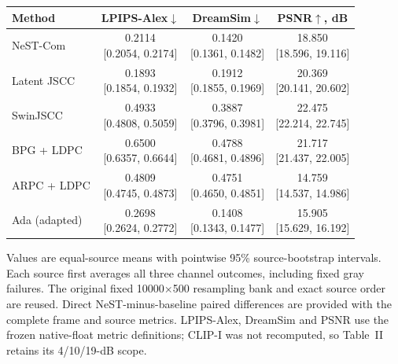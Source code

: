 \begin{center}\footnotesize\setlength{\tabcolsep}{5pt}
\begin{tabular}{lccc}\toprule
Method & LPIPS-Alex$\downarrow$ & DreamSim$\downarrow$ & PSNR$\uparrow$, dB\\\midrule
NeST-Com & \shortstack{0.2114\\{}[0.2054, 0.2174]} & \shortstack{0.1420\\{}[0.1361, 0.1482]} & \shortstack{18.850\\{}[18.596, 19.116]}\\[3pt]
Latent JSCC & \shortstack{0.1893\\{}[0.1854, 0.1932]} & \shortstack{0.1912\\{}[0.1855, 0.1969]} & \shortstack{20.369\\{}[20.141, 20.602]}\\[3pt]
SwinJSCC & \shortstack{0.4933\\{}[0.4808, 0.5059]} & \shortstack{0.3887\\{}[0.3796, 0.3981]} & \shortstack{22.475\\{}[22.214, 22.745]}\\[3pt]
BPG + LDPC & \shortstack{0.6500\\{}[0.6357, 0.6644]} & \shortstack{0.4788\\{}[0.4681, 0.4896]} & \shortstack{21.717\\{}[21.437, 22.005]}\\[3pt]
ARPC + LDPC & \shortstack{0.4809\\{}[0.4745, 0.4873]} & \shortstack{0.4751\\{}[0.4650, 0.4851]} & \shortstack{14.759\\{}[14.537, 14.986]}\\[3pt]
Ada (adapted) & \shortstack{0.2698\\{}[0.2624, 0.2772]} & \shortstack{0.1408\\{}[0.1343, 0.1477]} & \shortstack{15.905\\{}[15.629, 16.192]}\\[3pt]
\bottomrule\end{tabular}\end{center}
Values are equal-source means with pointwise 95\% source-bootstrap intervals. Each source first averages all three channel outcomes, including fixed gray failures. The original fixed 10000$\times$500 resampling bank and exact source order are reused. Direct NeST-minus-baseline paired differences are provided with the complete frame and source metrics. LPIPS-Alex, DreamSim and PSNR use the frozen native-float metric definitions; CLIP-I was not recomputed, so Table~II retains its 4/10/19-dB scope.

